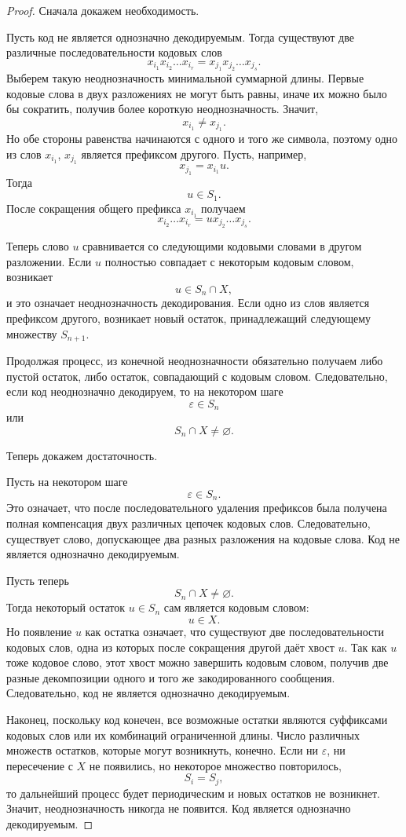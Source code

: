 \documentclass[12pt,a4paper]{article}
\begin{document}
\begin{proof}
Сначала докажем необходимость.

Пусть код не является однозначно декодируемым.
Тогда существуют две различные последовательности кодовых слов
\[
    x_{i_1}x_{i_2}\dots x_{i_r}
    =
    x_{j_1}x_{j_2}\dots x_{j_s}.
\]
Выберем такую неоднозначность минимальной суммарной длины.
Первые кодовые слова в двух разложениях не могут быть равны, иначе их можно было бы сократить, получив более короткую неоднозначность.
Значит,
\[
    x_{i_1}\ne x_{j_1}.
\]
Но обе стороны равенства начинаются с одного и того же символа, поэтому одно из слов $x_{i_1}$, $x_{j_1}$ является префиксом другого.
Пусть, например,
\[
    x_{j_1}=x_{i_1}u.
\]
Тогда
\[
    u\in S_1.
\]
После сокращения общего префикса $x_{i_1}$ получаем
\[
    x_{i_2}\dots x_{i_r}
    =
    u x_{j_2}\dots x_{j_s}.
\]

Теперь слово $u$ сравнивается со следующими кодовыми словами в другом разложении.
Если $u$ полностью совпадает с некоторым кодовым словом, возникает
\[
    u\in S_n\cap X,
\]
и это означает неоднозначность декодирования.
Если одно из слов является префиксом другого, возникает новый остаток, принадлежащий следующему множеству $S_{n+1}$.

Продолжая процесс, из конечной неоднозначности обязательно получаем либо пустой остаток, либо остаток, совпадающий с кодовым словом.
Следовательно, если код неоднозначно декодируем, то на некотором шаге
\[
    \varepsilon\in S_n
\]
или
\[
    S_n\cap X\ne\varnothing.
\]

Теперь докажем достаточность.

Пусть на некотором шаге
\[
    \varepsilon\in S_n.
\]
Это означает, что после последовательного удаления префиксов была получена полная компенсация двух различных цепочек кодовых слов.
Следовательно, существует слово, допускающее два разных разложения на кодовые слова.
Код не является однозначно декодируемым.

Пусть теперь
\[
    S_n\cap X\ne\varnothing.
\]
Тогда некоторый остаток $u\in S_n$ сам является кодовым словом:
\[
    u\in X.
\]
Но появление $u$ как остатка означает, что существуют две последовательности кодовых слов, одна из которых после сокращения другой даёт хвост $u$.
Так как $u$ тоже кодовое слово, этот хвост можно завершить кодовым словом, получив две разные декомпозиции одного и того же закодированного сообщения.
Следовательно, код не является однозначно декодируемым.

Наконец, поскольку код конечен, все возможные остатки являются суффиксами кодовых слов или их комбинаций ограниченной длины.
Число различных множеств остатков, которые могут возникнуть, конечно.
Если ни $\varepsilon$, ни пересечение с $X$ не появились, но некоторое множество повторилось,
\[
    S_i=S_j,
\]
то дальнейший процесс будет периодическим и новых остатков не возникнет.
Значит, неоднозначность никогда не появится.
Код является однозначно декодируемым.
\end{proof}
\end{document}
